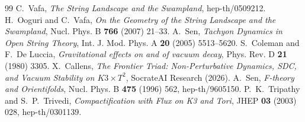 \documentclass[11pt,a4paper]{article}
\begin{document}
\begin{thebibliography}{99}
 C.~Vafa, \emph{The String Landscape and the Swampland}, hep-th/0509212.
 H.~Ooguri and C.~Vafa, \emph{On the Geometry of the String Landscape and the Swampland}, Nucl. Phys. B \textbf{766} (2007) 21--33.
 A.~Sen, \emph{Tachyon Dynamics in Open String Theory}, Int. J. Mod. Phys. A \textbf{20} (2005) 5513--5620.
 S.~Coleman and F.~De Luccia, \emph{Gravitational effects on and of vacuum decay}, Phys. Rev. D \textbf{21} (1980) 3305.
 X.~Callens, \emph{The Frontier Triad: Non-Perturbative Dynamics, SDC, and Vacuum Stability on $K3 \times T^2$}, SocrateAI Research (2026).
 A.~Sen, \emph{F-theory and Orientifolds}, Nucl. Phys. B \textbf{475} (1996) 562, hep-th/9605150.
 P.~K.~Tripathy and S.~P.~Trivedi, \emph{Compactification with Flux on K3 and Tori}, JHEP \textbf{03} (2003) 028, hep-th/0301139.
\end{thebibliography}
\end{document}
